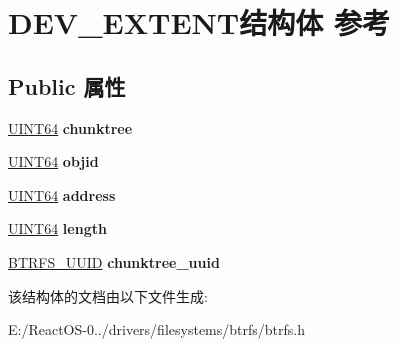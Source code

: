 \hypertarget{struct_d_e_v___e_x_t_e_n_t}{}\section{D\+E\+V\+\_\+\+E\+X\+T\+E\+N\+T结构体 参考}
\label{struct_d_e_v___e_x_t_e_n_t}
\subsection*{Public 属性}
\begin{DoxyCompactItemize}
\item 
\mbox{\label{struct_d_e_v___e_x_t_e_n_t_af1d70ec289f3769bc55fd757c104b670}} 
\hyperlink{_processor_bind_8h_a57be03562867144161c1bfee95ca8f7c}{U\+I\+N\+T64} {\bfseries chunktree}
\item 
\mbox{\label{struct_d_e_v___e_x_t_e_n_t_a9fdd7e59eb94fcd1f11ba63816137db5}} 
\hyperlink{_processor_bind_8h_a57be03562867144161c1bfee95ca8f7c}{U\+I\+N\+T64} {\bfseries objid}
\item 
\mbox{\label{struct_d_e_v___e_x_t_e_n_t_a6a1da3b1f1fdbdd404cb9a75d69e1d71}} 
\hyperlink{_processor_bind_8h_a57be03562867144161c1bfee95ca8f7c}{U\+I\+N\+T64} {\bfseries address}
\item 
\mbox{\label{struct_d_e_v___e_x_t_e_n_t_a42d6c04d981121dea4e1b764045c80d7}} 
\hyperlink{_processor_bind_8h_a57be03562867144161c1bfee95ca8f7c}{U\+I\+N\+T64} {\bfseries length}
\item 
\mbox{\label{struct_d_e_v___e_x_t_e_n_t_a05d123efd37d476d860417cddfe1cd3d}} 
\hyperlink{struct_b_t_r_f_s___u_u_i_d}{B\+T\+R\+F\+S\+\_\+\+U\+U\+ID} {\bfseries chunktree\+\_\+uuid}
\end{DoxyCompactItemize}


该结构体的文档由以下文件生成\+:\begin{DoxyCompactItemize}
\item 
E\+:/\+React\+O\+S-\/0../drivers/filesystems/btrfs/btrfs.\+h\end{DoxyCompactItemize}
